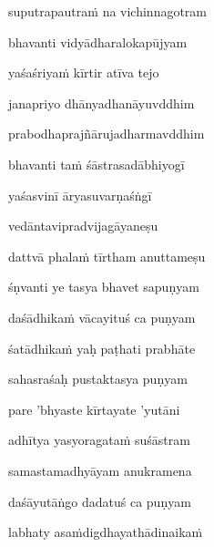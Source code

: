 \nemslokac 
suputrapautraṁ na vichinnagotram
\dontdisplaylinenum

\nemslokad 
bhavanti vidyādharalokapūjyam \veg\dontdisplaylinenum
{}

\ujvers\nemsloka 
yaśaśriyaṁ kīrtir atīva tejo
\dontdisplaylinenum

\nemslokab 
janapriyo dhānyadhanāyuvddhim \danda\dontdisplaylinenum

\nemslokac 
prabodhaprajñārujadharmavddhim
\dontdisplaylinenum

\nemslokad 
bhavanti taṁ śāstrasadābhiyogī \veg\dontdisplaylinenum
{}

\ujvers\nemsloka 
yaśasvinī āryasuvarṇaśṅgī
\dontdisplaylinenum

\nemslokab 
vedāntavipradvijagāyaneṣu \danda\dontdisplaylinenum

\nemslokac 
dattvā phalaṁ tīrtham anuttameṣu
\dontdisplaylinenum

\nemslokad 
śṇvanti ye tasya bhavet sapuṇyam \veg\dontdisplaylinenum
{}

\ujvers\nemsloka 
daśādhikaṁ vācayituś ca puṇyam
\dontdisplaylinenum

\nemslokab 
śatādhikaṁ yaḥ paṭhati prabhāte \danda\dontdisplaylinenum

\nemslokac 
sahasraśaḥ pustaktasya puṇyam
\dontdisplaylinenum

\nemslokad 
pare 'bhyaste kīrtayate 'yutāni \veg\dontdisplaylinenum
{}

\ujvers\nemsloka 
adhītya yasyoragataṁ suśāstram
\dontdisplaylinenum

\nemslokab 
samastamadhyāyam anukramena \danda\dontdisplaylinenum

\nemslokac 
daśāyutāṅgo dadatuś ca puṇyam
\dontdisplaylinenum

\nemslokad 
labhaty asaṁdigdhayathādinaikaṁ \veg\dontdisplaylinenum
{}


